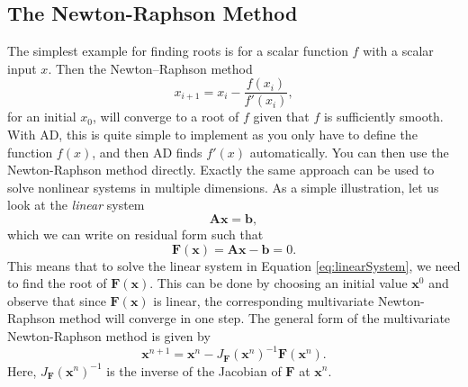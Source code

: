 \subsection{The Newton-Raphson Method}
The simplest example for finding roots is for a scalar function $f$ with a scalar input $x$. Then the Newton--Raphson method
\begin{equation*}
    x_{i+1} = x_i - \frac{f(x_i)}{f'(x_i)},
\end{equation*}
for an initial $x_0$, will converge to a root of $f$ given that $f$ is sufficiently smooth. With AD, this is quite simple to implement as you only have to define the function $f(x)$, and then AD finds $f'(x)$ automatically. You can then use the Newton-Raphson method directly. Exactly the same approach can be used to solve nonlinear systems in multiple dimensions. As a simple illustration, let us look at the \emph{linear} system 
\begin{equation}
    \textbf{A}\boldsymbol{x} = \textbf{b},
    \label{eq:linearSystem}
\end{equation}
which we can write on residual form such that
\begin{equation*}
	\boldsymbol{F}(\boldsymbol{x}) = \textbf{A}\boldsymbol{x} - \boldsymbol{b} = 0 .
\end{equation*}
This means that to solve the linear system in Equation \eqref{eq:linearSystem}, we need to find the root of $\boldsymbol{F}(\boldsymbol{x})$. This can be done by choosing an initial value $\boldsymbol{x}^0$ and observe that since $\boldsymbol{F}(\boldsymbol{x})$ is linear, the corresponding multivariate Newton-Raphson method will converge in one step. The general form of the multivariate Newton-Raphson method is given by
\begin{equation}
	\boldsymbol{x}^{n+1} = \boldsymbol{x}^n - J_{\boldsymbol{F}}  (\boldsymbol{x}^n)^{-1} \boldsymbol{F}(\boldsymbol{x}^n).
    \label{eq:newtonRaphsonVector}
\end{equation}
Here, $J_{\boldsymbol{F}}  (\boldsymbol{x}^n)^{-1}$ is the inverse of the Jacobian of $\boldsymbol{F}$ at $\boldsymbol{x}^n$. 

